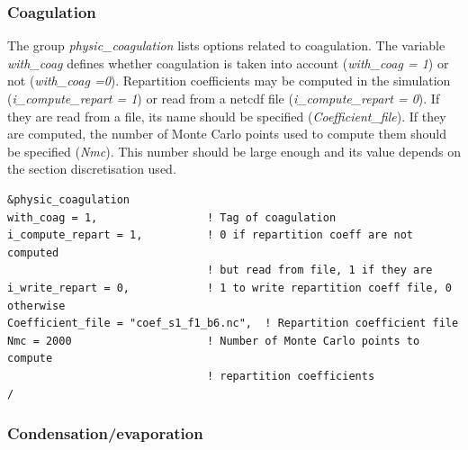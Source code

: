 \documentclass[a4paper,11pt]{article}
\begin{document}
\subsubsection{Coagulation}

The group {\textit{physic\_coagulation}} lists options related to coagulation. The variable {\textit{with\_coag}} defines whether coagulation is taken into account ({\textit{with\_coag = 1}}) or not ({\textit{with\_coag =0}}). 
Repartition coefficients may be computed in the simulation ({\textit{i\_compute\_repart = 1}}) or read from a netcdf file ({\textit{i\_compute\_repart = 0}}). If they are read from a file, its name should be specified ({\textit{Coefficient\_file}}). If they are computed, the number of Monte Carlo points used to compute them should be specified ({\textit{Nmc}}). This number should be large enough and its value depends on the section discretisation used.


\begin{verbatim}
&physic_coagulation
with_coag = 1,                 ! Tag of coagulation
i_compute_repart = 1,          ! 0 if repartition coeff are not computed 
                               ! but read from file, 1 if they are 
i_write_repart = 0,            ! 1 to write repartition coeff file, 0 otherwise
Coefficient_file = "coef_s1_f1_b6.nc",  ! Repartition coefficient file
Nmc = 2000                     ! Number of Monte Carlo points to compute
                               ! repartition coefficients
/
\end{verbatim}
          
\subsubsection{Condensation/evaporation}
\end{document}
